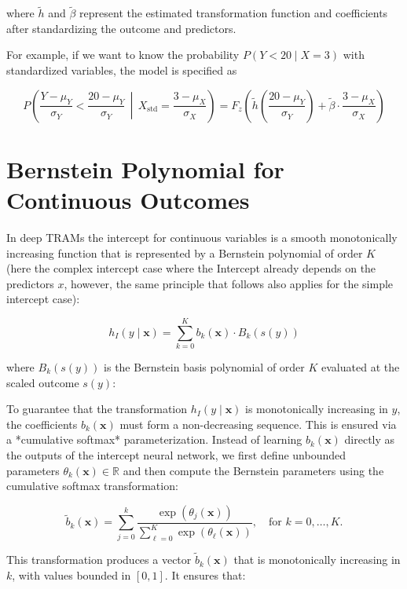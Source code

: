 where $\tilde{h}$ and $\tilde{\beta}$ represent the estimated transformation function and coefficients after standardizing the outcome and predictors.

For example, if we want to know the probability \( P(Y < 20 \mid X = 3) \) with standardized variables, the model is specified as

\[
P\left(\frac{Y - \mu_Y}{\sigma_Y} < \frac{20 - \mu_Y}{\sigma_Y} \,\middle|\, X_{\text{std}} = \frac{3 - \mu_X}{\sigma_X} \right)
= F_z\left(\tilde{h}\left(\frac{20 - \mu_Y}{\sigma_Y}\right) + \tilde{\beta} \cdot \frac{3 - \mu_X}{\sigma_X} \right)
\]


\section{Bernstein Polynomial for Continuous Outcomes}

In deep TRAMs the intercept for continuous variables is a smooth monotonically increasing function that is represented by a Bernstein polynomial of order \( K \) (here the complex intercept case where the Intercept already depends on the predictors $x$, however, the same principle that follows also applies for the simple intercept case):

\begin{equation}
h_I(y \mid \mathbf{x}) = \sum_{k=0}^{K} b_k(\mathbf{x}) \cdot B_k(s(y))
\label{eq:bernstein_intercept}
\end{equation}

where \( B_k(s(y)) \) is the Bernstein basis polynomial of order \( K \) evaluated at the scaled outcome \( s(y) \):


To guarantee that the transformation \( h_I(y \mid \mathbf{x}) \) is monotonically increasing in \( y \), the coefficients \( b_k(\mathbf{x}) \) must form a non-decreasing sequence. This is ensured via a *cumulative softmax* parameterization. Instead of learning \( b_k(\mathbf{x}) \) directly as the outputs of the intercept neural network, we first define unbounded parameters \( \theta_k(\mathbf{x}) \in \mathbb{R} \) and then compute the Bernstein parameters using the cumulative softmax transformation:

\begin{equation}
\tilde{b}_k(\mathbf{x}) = \sum_{j=0}^{k} \frac{\exp(\theta_j(\mathbf{x}))}{\sum_{\ell=0}^{K} \exp(\theta_\ell(\mathbf{x}))}, \quad \text{for } k = 0, \ldots, K.
\end{equation}

This transformation produces a vector \( \tilde{b}_k(\mathbf{x}) \) that is monotonically increasing in \( k \), with values bounded in \( [0, 1] \). It ensures that:


